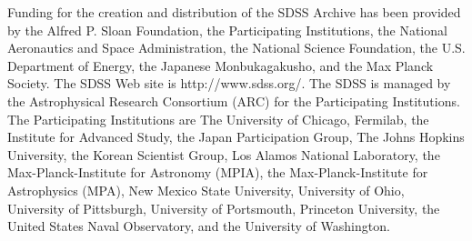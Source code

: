 \documentclass[12pt,preprint]{aastex}
\begin{document}
Funding for the creation and distribution of the SDSS Archive has been
provided by the Alfred P. Sloan Foundation, the Participating
Institutions, the National Aeronautics and Space Administration, the
National Science Foundation, the U.S. Department of Energy, the
Japanese Monbukagakusho, and the Max Planck Society. The SDSS Web site
is http://www.sdss.org/. The SDSS is managed by the Astrophysical
Research Consortium (ARC) for the Participating Institutions. The
Participating Institutions are The University of Chicago, Fermilab,
the Institute for Advanced Study, the Japan Participation Group,
The Johns Hopkins University, the Korean Scientist Group, Los Alamos
National Laboratory, the Max-Planck-Institute for Astronomy (MPIA),
the Max-Planck-Institute for Astrophysics (MPA), New Mexico State
University, University of Ohio, University of Pittsburgh,
University of Portsmouth,
Princeton University, the United States Naval Observatory, and
the University of Washington.

\newpage



\end{document}
